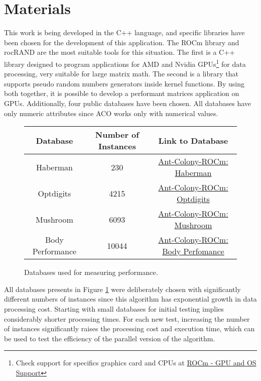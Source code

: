 \section{Materials} \label{Materials}

This work is being developed in the C++ language, and specific libraries have been chosen for the development of this application. The ROCm library\cite{rocm} and rocRAND\cite{rocrand} are the most suitable tools for this situation.
The first is a C++ library designed to program applications for AMD and Nvidia GPUs\footnote{Check support for specifics graphics card and CPUs at \href{https://rocm.docs.amd.com/en/latest/release/gpu_os_support.html}{ROCm - GPU and OS Support}} for data processing, very suitable for large matrix math.
The second is a library that supports pseudo random numbers generators inside kernel functions. By using both together, it is possible to develop a performant matrices application on GPUs.
Additionally, four public databases have been chosen. All databases have only numeric attributes since ACO works only with numerical values.

\begin{figure}
    \centering
    \begin{tabular}{|c|c|c|}
        \hline
        Database & Number of Instances & Link to Database \\
        \hline
        Haberman & 230 & \href{https://raw.githubusercontent.com/LucasSnatiago/Ant-Colony-ROCm/main/database/haberman_treino_normal.csv}{Ant-Colony-ROCm: Haberman} \\
        Optdigits & 4215 & \href{https://raw.githubusercontent.com/LucasSnatiago/Ant-Colony-ROCm/main/database/optdigits_treino_normal.csv}{Ant-Colony-ROCm: Optdigits} \\
        Mushroom & 6093 & \href{https://raw.githubusercontent.com/LucasSnatiago/Ant-Colony-ROCm/main/database/mushrooms_treino_normal.csv}{Ant-Colony-ROCm: Mushroom} \\
        Body Performance & 10044 & \href{https://raw.githubusercontent.com/LucasSnatiago/Ant-Colony-ROCm/main/database/body_performance_treino_normal.csv}{Ant-Colony-ROCm: Body Perfomance} \\
        \hline
    \end{tabular}
    \caption{Databases used for measuring performance.}
    \label{fig:datasets}
\end{figure}
All databases presents in Figure \ref{fig:datasets} were deliberately chosen with significantly different numbers of instances since this algorithm has exponential growth in data processing cost. Starting with small databases for initial testing implies considerably shorter processing times. For each new test, increasing the number of instances significantly raises the processing cost and execution time, which can be used to test the efficiency of the parallel version of the algorithm.


